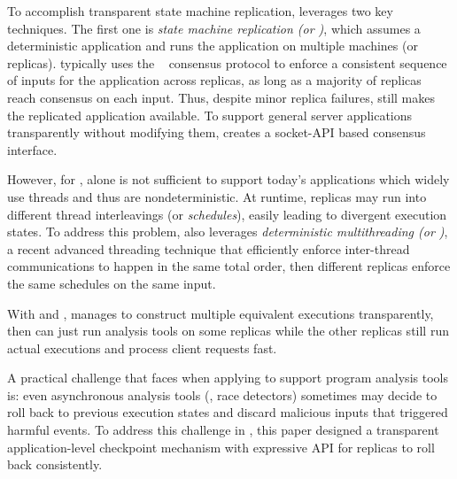 To accomplish transparent state machine replication, \repbox leverages two key 
techniques. The first one is \emph{state machine replication (or \smr)}, which assumes a deterministic 
application and runs the application on multiple machines (or replicas). \smr 
typically uses the \paxos~\cite{paxos} consensus protocol to enforce a 
consistent sequence of inputs for the application across replicas, as long as a 
majority of replicas reach consensus on each input. Thus, despite minor replica 
failures, \smr still makes the replicated application available. To support general server 
 applications transparently without modifying 
them, \repbox creates a socket-API based \paxos consensus interface.


However, for \repbox, \smr alone is not sufficient to support today's 
applications which widely use threads and thus are nondeterministic. At runtime, 
replicas may run into different thread interleavings (or \emph{schedules}), 
easily leading to divergent execution states. To address this problem, \repbox 
also leverages \emph{deterministic multithreading (or \dmt)}, a recent advanced 
threading technique that efficiently enforce inter-thread communications to 
happen in the same total order, then different replicas enforce the same schedules 
on the same input.

With \smr and \dmt, \repbox manages to construct multiple equivalent executions 
transparently, then \xxx can just run analysis tools on some replicas while the other replicas 
still run actual executions and process client requests fast.


A practical challenge that faces \xxx when applying \repbox to support program 
analysis tools is: even asynchronous analysis tools (\eg, race detectors) 
sometimes may decide to roll back to previous execution states and discard 
malicious inputs that triggered harmful events. To address this challenge in 
\xxx, this paper designed a transparent application-level checkpoint mechanism 
with expressive API for replicas to roll back consistently.



